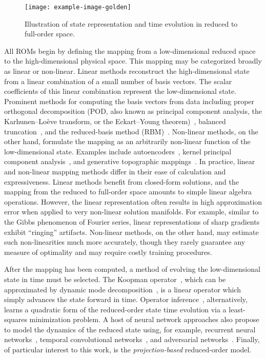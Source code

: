 \begin{figure}
	\centering
	\texttt{[image: example-image-golden]}
	\caption{\label{fig:mappingVis}Illustration of state representation and time evolution in reduced to full-order space.}
\end{figure}

All ROMs begin by defining the mapping from a low-dimensional reduced space to the high-dimensional physical space. This mapping may be categorized broadly as linear or non-linear. Linear methods reconstruct the high-dimensional state from a linear combination of a small number of basis vectors. The scalar coefficients of this linear combination represent the low-dimensional state. Prominent methods for computing the basis vectors from data including proper orthogonal decomposition (POD, also known as principal component analysis, the Karhunen--Loève transform, or the Eckart--Young theorem)~\cite{berkoozPOD}, balanced truncation~\cite{Gugercin2004}, and the reduced-basis method (RBM)~\cite{reducedBasisBook}. Non-linear methods, on the other hand, formulate the mapping as an arbitrarily non-linear function of the low-dimensional state. Examples include autoencoders~\cite{Kramer1991}, kernel principal component analysis~\cite{kernelPCA}, and generative topographic mappings~\cite{Bishop1997}. In practice, linear and non-linear mapping methods differ in their ease of calculation and expressiveness. Linear methods benefit from closed-form solutions, and the mapping from the reduced to full-order space amounts to simple linear algebra operations. However, the linear representation often results in high approximation error when applied to very non-linear solution manifolds. For example, similar to the Gibbs phenomenon of Fourier series, linear representations of sharp gradients exhibit ``ringing'' artifacts. Non-linear methods, on the other hand, may estimate such non-linearities much more accurately, though they rarely guarantee any measure of optimality and may require costly training procedures.

After the mapping has been computed, a method of evolving the low-dimensional state in time must be selected. The Koopman operator~\cite{Budisic2012}, which can be approximated by dynamic mode decomposition~\cite{Schmid2010}, is a linear operator which simply advances the state forward in time. Operator inference~\cite{Peherstorfer2016}, alternatively, learns a quadratic form of the reduced-order state time evolution via a least-squares minimization problem. A host of neural network approaches also propose to model the dynamics of the reduced state using, for example, recurrent neural networks~\cite{Gonzalez2018}, temporal convolutional networks~\cite{Xu2020}, and adversarial networks~\cite{QuilodranCasas2021}. Finally, of particular interest to this work, is the \textit{projection-based} reduced-order model.

